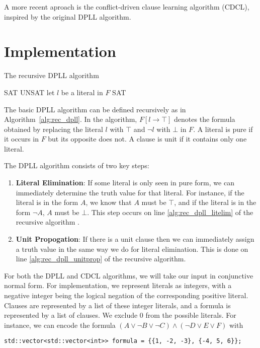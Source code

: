 \documentclass[10pt,AMS Euler]{article}
\begin{document}
A more recent aproach is the conflict-driven clause learning algorithm (CDCL), inspired by the original DPLL
algorithm. 

\section*{Implementation}
\label{sec:org3f4a953}
\begin{algorithm}
\caption{The recursive DPLL algorithm}
\label{alg:rec_dpll}
\begin{algorithmic}[1]
  \State \Return SAT
  \State \Return UNSAT
 \label{alg:rec_dpll_litelim}
  \State \Return {}
 \label{alg:rec_dpll_unitprop}
  \State \Return {}
\Else
  \State let $l$ be a literal in $F$ \label{alg:rec_dpll_branch}
    \State \Return SAT
  \Else
    \State \Return {}
  \EndIf
\EndIf
\EndFunction
\end{algorithmic}
\end{algorithm}

The basic DPLL algorithm can be defined recursively as in Algorithm~\ref{alg:rec_dpll}.
In the algorithm, \(F[l \to \top]\) denotes the formula obtained by replacing the literal \(l\) with \(\top\) and
\(\neg l\) with \(\bot\) in \(F\). A literal is pure if it occurs in \(F\) but its opposite does not. A clause is unit
if it contains only one literal.

The DPLL algorithm consists of two key steps:
\begin{enumerate}
\item \textbf{Literal Elimination}: If some literal is only seen in pure form, we can immediately determine the
truth value for that literal. For instance, if the literal is in the form \(A\), we know that \(A\) must be
\(\top\), and if the literal is in the form \(\neg A\), \(A\) must be \(\bot\). This step occurs on line
\ref{alg:rec_dpll_litelim} of the recursive algorithm .
\item \textbf{Unit Propogation}: If there is a unit clause then we can immediately assign a truth value in the same
way we do for literal elimination. This is done on line \ref{alg:rec_dpll_unitprop} of the recursive
algorithm.
\end{enumerate}

For both the DPLL and CDCL algorithms, we will take our input in conjunctive normal form. For implementation,
we represent literals as integers, with a negative integer being the logical negation of the corresponding
positive literal. Clauses are represented by a list of these integer literals, and a formula is represented
by a list of clauses. We exclude 0 from the possible literals.
For instance, we can encode the formula \((A \lor \neg B \lor \neg C) \land (\neg D \lor E \lor F)\) with
\begin{verbatim}
std::vector<std::vector<int>> formula = {{1, -2, -3}, {-4, 5, 6}};
\end{verbatim}
\end{document}
